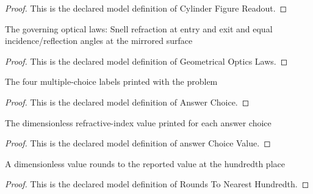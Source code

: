 \begin{proof}
  This is the declared model definition of Cylinder Figure Readout.
\end{proof}
\begin{definition}
  \label{def:physics:phyx-mini-0020:phyxminiproblems-problemphyxmini0020-geometricalopticslaws}
  The governing optical laws: Snell refraction at entry and exit and equal incidence/reflection angles at the mirrored surface
\end{definition}
\begin{proof}
  This is the declared model definition of Geometrical Optics Laws.
\end{proof}
\begin{definition}
  \label{def:physics:phyx-mini-0020:phyxminiproblems-problemphyxmini0020-answerchoice}
  The four multiple-choice labels printed with the problem
\end{definition}
\begin{proof}
  This is the declared model definition of Answer Choice.
\end{proof}
\begin{definition}
  \label{def:physics:phyx-mini-0020:phyxminiproblems-problemphyxmini0020-answerchoicevalue}
  The dimensionless refractive-index value printed for each answer choice
\end{definition}
\begin{proof}
  This is the declared model definition of answer Choice Value.
\end{proof}
\begin{definition}
  \label{def:physics:phyx-mini-0020:phyxminiproblems-problemphyxmini0020-roundstonearesthundredth}
  A dimensionless value rounds to the reported value at the hundredth place
\end{definition}
\begin{proof}
  This is the declared model definition of Rounds To Nearest Hundredth.
\end{proof}
